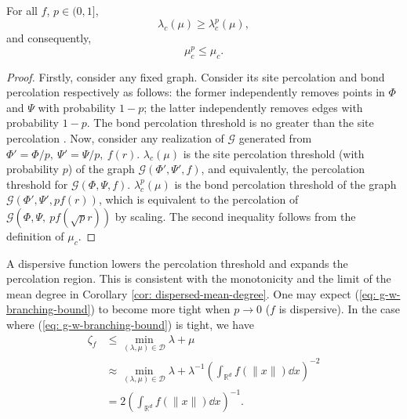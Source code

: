      

 
 \begin{theorem}
 For all $f$, $p\in(0,1]$, 
\begin{equation}
\lambda_c(\mu)\geq \lambda_c^p(\mu),\nonumber
\end{equation} 
and consequently,
\[\mu_c^p\leq\mu_c.\]
 \end{theorem}
\begin{proof}
Firstly, consider any fixed graph. Consider its site percolation and bond percolation respectively \cite[Chapter 1]{grimmett1999percolation} as follows: the former  independently removes points in $\Phi$ and $\Psi$ with probability $1-p$; the latter independently removes edges with probability $1-p$. The bond percolation threshold is no greater than the site percolation \cite{Franceschetti05continuumpercolation}.
Now, consider any realization of $\mathcal{G}$ generated from $\Phi'=\Phi/p,~\Psi'=\Psi/p,~f(r)$. $\lambda_c(\mu)$ is the site percolation threshold (with probability $p$) of the graph $\mathcal{G}(\Phi',\Psi',f)$, and  equivalently, the percolation threshold for $\mathcal{G}(\Phi,\Psi,f)$. $\lambda_c^p(\mu)$ is the bond percolation threshold of the graph $\mathcal{G}(\Phi',\Psi',pf(r))$, which is equivalent to the percolation of $\mathcal{G}(\Phi,\Psi,~pf(\sqrt{p}r))$ by  scaling. The second inequality follows from the definition of $\mu_c$.
\end{proof}
  A dispersive function lowers the percolation threshold and expands the percolation region. This is consistent with the monotonicity and the limit of the mean degree in Corollary \ref{cor: dispersed-mean-degree}.
One may expect (\ref{eq: g-w-branching-bound}) to become more tight when $p\to0$ ($f$ is dispersive).  In the case where (\ref{eq: g-w-branching-bound}) is tight, we have \begin{align}
        \zeta_f &\leq \min_{(\lambda,\mu)\in\mathcal{D}}\lambda+\mu\nonumber \\
        &\approx \min_{(\lambda,\mu)\in\mathcal{D}} \lambda + {\lambda^{-1}\left(\int_{\mathbb{R}^d}f(\|x\|) \dd x\right)^{-2}} \nonumber\\
        &= {2}{\left(\int_{\mathbb{R}^d}f(\|x\|) \dd x\right)}^{-1}.\nonumber
\end{align}

